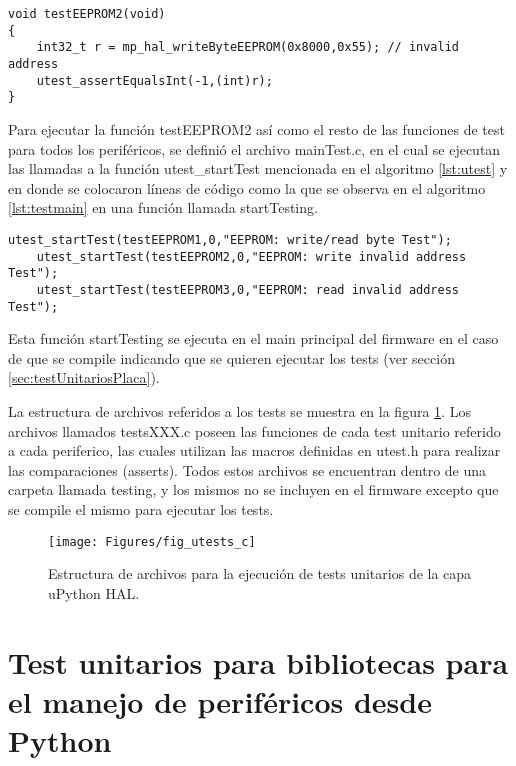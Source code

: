 \begin{lstlisting}[label={lst:testeeprom},caption=Ejemplo de un test unitario para la EEPROM usando una dirección inválida.]
void testEEPROM2(void)
{
	int32_t r = mp_hal_writeByteEEPROM(0x8000,0x55); // invalid address
	utest_assertEqualsInt(-1,(int)r);
}
\end{lstlisting}

Para ejecutar la función testEEPROM2 así como el resto de las funciones de test para todos los periféricos, se definió el archivo mainTest.c, en el cual se ejecutan las llamadas a la función utest\_startTest mencionada en el algoritmo \ref{lst:utest} y en donde se colocaron líneas de código como la que se observa en el algoritmo \ref{lst:testmain} en una función llamada startTesting. 

\begin{lstlisting}[label={lst:testmain},caption=Ejemplo de ejecución de funciones de test en archivo mainTest.c.]
	utest_startTest(testEEPROM1,0,"EEPROM: write/read byte Test");
	utest_startTest(testEEPROM2,0,"EEPROM: write invalid address Test");
	utest_startTest(testEEPROM3,0,"EEPROM: read invalid address Test");
\end{lstlisting}

Esta función startTesting se ejecuta en el main principal del firmware en el caso de que se compile indicando que se quieren ejecutar los tests (ver sección \ref{sec:testUnitariosPlaca}).

La estructura de archivos referidos a los tests se muestra en la figura \ref{fig:utestcarq}. Los archivos llamados testsXXX.c poseen las funciones de cada test unitario referido a cada periferico, las cuales utilizan las macros definidas en utest.h para realizar las comparaciones (asserts). Todos estos archivos se encuentran dentro de una carpeta llamada testing, y los mismos no se incluyen en el firmware excepto que se compile el mismo para ejecutar los tests.

\begin{figure}[ht]
  \centering
    \texttt{[image: Figures/fig\_utests\_c]}
  \caption{Estructura de archivos para la ejecución de tests unitarios de la capa uPython HAL.}
  \label{fig:utestcarq}
\end{figure}


\section{Test unitarios para bibliotecas para el manejo de periféricos desde Python}
\label{sec:testUnitariosPython}

